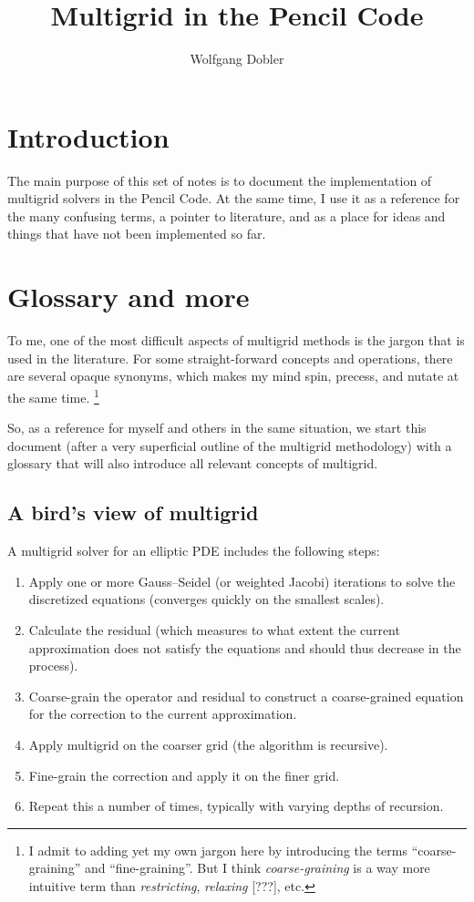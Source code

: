 \documentclass[\mydriver,12pt,twoside,notitlepage,letterpaper]{article}
\title{Multigrid in the Pencil Code}
\author{Wolfgang Dobler}
\begin{document}
\thispagestyle{empty}

\maketitle

\tableofcontents


\section{Introduction}

The main purpose of this set of notes is to document the
implementation of multigrid solvers in the Pencil Code.
At the same time, I use it as a reference for the many confusing terms, a
pointer to literature, and as a place for ideas and things that have not
been implemented so far.


\section{Glossary and more}

To me, one of the most difficult aspects of multigrid methods is the
jargon that is used in the literature.
For some straight-forward concepts and operations, there are several
opaque synonyms, which makes my mind spin, precess, and nutate at the same
time.
\footnote{
  I admit to adding yet my own jargon here by introducing the terms
  ``coarse-graining'' and ``fine-graining''.
  But I think \emph{coarse-graining} is a way more intuitive term than
  \emph{restricting}, \emph{relaxing} [???], etc.}

So, as a reference for myself and others in the same situation, we start
this document (after a very superficial outline of the multigrid
methodology) with a glossary that will also introduce all relevant
concepts of multigrid.


\subsection{A bird's view of multigrid}

A multigrid solver for an elliptic PDE includes the following steps:
\begin{enumerate}
\item Apply one or more Gauss--Seidel (or weighted Jacobi) iterations to
  solve the discretized equations (converges quickly on the smallest
  scales).
\item Calculate the residual (which measures to what extent the current
  approximation does not satisfy the equations and should thus decrease in
  the process).
\item Coarse-grain the operator and residual to construct a coarse-grained
  equation for the correction to the current approximation.
\item Apply multigrid on the coarser grid (the algorithm is recursive).
\item Fine-grain the correction and apply it on the finer grid.
\item Repeat this a number of times, typically with varying depths of
  recursion.
\end{enumerate}
\end{document}
